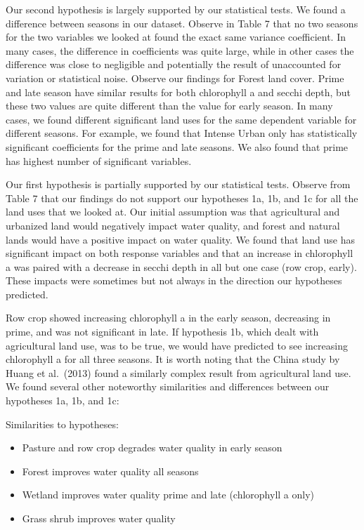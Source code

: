 \documentclass[12pt,]{article}
\providecommand{\tightlist}{%
  \setlength{\itemsep}{0pt}\setlength{\parskip}{0pt}}
\begin{document}
Our second hypothesis is largely supported by our statistical tests. We
found a difference between seasons in our dataset. Observe in Table 7
that no two seasons for the two variables we looked at found the exact
same variance coefficient. In many cases, the difference in coefficients
was quite large, while in other cases the difference was close to
negligible and potentially the result of unaccounted for variation or
statistical noise. Observe our findings for Forest land cover. Prime and
late season have similar results for both chlorophyll a and secchi
depth, but these two values are quite different than the value for early
season. In many cases, we found different significant land uses for the
same dependent variable for different seasons. For example, we found
that Intense Urban only has statistically significant coefficients for
the prime and late seasons. We also found that prime has highest number
of significant variables.

Our first hypothesis is partially supported by our statistical tests.
Observe from Table 7 that our findings do not support our hypotheses 1a,
1b, and 1c for all the land uses that we looked at. Our initial
assumption was that agricultural and urbanized land would negatively
impact water quality, and forest and natural lands would have a positive
impact on water quality. We found that land use has significant impact
on both response variables and that an increase in chlorophyll a was
paired with a decrease in secchi depth in all but one case (row crop,
early). These impacts were sometimes but not always in the direction our
hypotheses predicted.

Row crop showed increasing chlorophyll a in the early season, decreasing
in prime, and was not significant in late. If hypothesis 1b, which dealt
with agricultural land use, was to be true, we would have predicted to
see increasing chlorophyll a for all three seasons. It is worth noting
that the China study by Huang et al.~(2013) found a similarly complex
result from agricultural land use. We found several other noteworthy
similarities and differences between our hypotheses 1a, 1b, and 1c:

Similarities to hypotheses:

\begin{itemize}
\tightlist
\item
  Pasture and row crop degrades water quality in early season
\item
  Forest improves water quality all seasons
\item
  Wetland improves water quality prime and late (chlorophyll a only)
\item
  Grass shrub improves water quality
\end{itemize}
\end{document}
